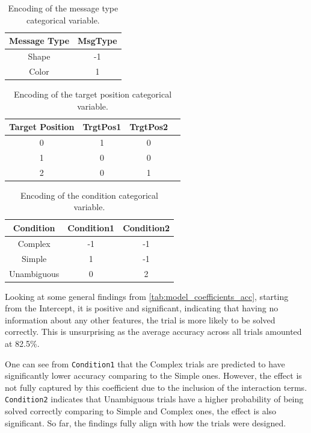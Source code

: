 \begin{table}[h!]
    \centering
    \begin{tabular}{|c|c|}
    \hline
    Message Type & \textbf{MsgType} \\ \hline
    Shape        & -1       \\ \hline
    Color        & 1        \\ \hline
    \end{tabular}
    \caption{Encoding of the message type categorical variable.}
    \label{tab:msgtype_encoding}
    \end{table}
    \hfill
    \begin{table}[h!]
    \centering
    \begin{tabular}{|c|c|c|c|}
    \hline
    Target Position & TrgtPos1 & TrgtPos2\\ \hline
    0               & 1    & 0    \\ \hline
    1               & 0    & 0    \\ \hline
    2               & 0    & 1    \\ \hline
    \end{tabular}
    \caption{Encoding of the target position categorical variable.}
    \label{tab:trgtpos_encoding}
    \end{table}
    \begin{table}[h!]
    \centering
    \begin{tabular}{|c|c|c|}
    \hline
    Condition     & Condition1 & Condition2 \\ \hline
    Complex       & -1   & -1   \\ \hline
    Simple        & 1    & -1   \\ \hline
    Unambiguous   & 0    & 2    \\ \hline
    \end{tabular}
    \caption{Encoding of the condition categorical variable.}
    \label{tab:condition_encoding}
\end{table}


Looking at some general findings from \autoref{tab:model_coefficients_acc}, starting from the Intercept, it is positive and significant, indicating that having no information about any other features, the trial is more likely to be solved correctly. This is unsurprising as the average accuracy across all trials amounted at 82.5\%. 

One can see from \texttt{Condition1} that the Complex trials are predicted to have significantly lower accuracy comparing to the Simple ones. However, the effect is not fully captured by this coefficient due to the inclusion of the interaction terms. \texttt{Condition2} indicates that Unambiguous trials have a higher probability of being solved correctly comparing to Simple and Complex ones, the effect is also significant. So far, the findings fully align with how the trials were designed. 

